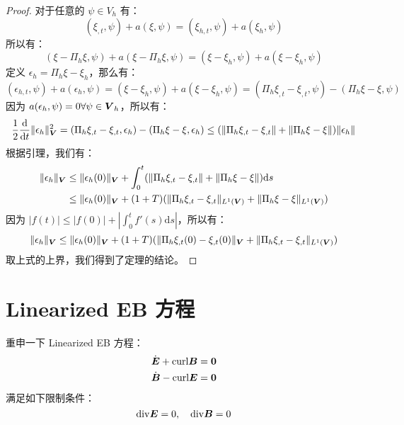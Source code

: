 \documentclass[lang=cn,a4paper,newtx]{elegantpaper}
\begin{document}
\begin{proof}
对于任意的 $\psi \in V_h$ 有：
$$
(\xi_{,t}, \psi) + a(\xi, \psi) =  (\xi_{h, t}, \psi) + a(\xi_h, \psi)
$$
所以有：
$$
(\xi - \Pi_h \xi, \psi) + a(\xi - \Pi_h \xi, \psi) = (\xi - \xi_h, \psi) + a(\xi
- \xi_h, \psi)
$$
定义 $\epsilon_h = \Pi_h \xi - \xi_h$，那么有：
$$
(\epsilon_{h, t}, \psi) + a(\epsilon_h, \psi) = (\xi - \xi_h, \psi) + a(\xi -
\xi_h, \psi)
= (\Pi_h \xi_{,t} - \xi_{,t}, \psi) - (\Pi_h \xi - \xi, \psi)
$$
因为 $a(\epsilon_h, \psi) = 0 \forall \psi \in \boldsymbol{V}_h$，所以有：
$$
\frac{1}{2} \frac{\mathrm{d}}{\mathrm{d}t}\|\epsilon_h\|^2_{\boldsymbol{V}} =
(\Pi_h \xi_{, t} - \xi_{, t}, \epsilon_h) - (\Pi_h \xi - \xi, \epsilon_h) \leq
(\|\Pi_h \xi_{, t} - \xi_{, t}\| + \|\Pi_h \xi - \xi\|)\|\epsilon_h\|
$$
根据引理，我们有：
$$
\begin{aligned}
\|\epsilon_h\|_{\boldsymbol{V}} & \leq \|\epsilon_h(0)\|_{\boldsymbol{V}} + \int_0^t
(\|\Pi_h \xi_{, t} - \xi_{, t}\| + \|\Pi_h \xi - \xi\|) \mathrm{d}s \\
& \leq \|\epsilon_h(0)\|_{\boldsymbol{V}} + (1+T)(\|\Pi_h \xi_{,t} - \xi_{, t}\|_{L^1(\boldsymbol{V})}
+ \|\Pi_h \xi - \xi\|_{L^1(\boldsymbol{V})})
\end{aligned}
$$
因为 $|f(t)| \leq |f(0)| + |\int_0^t f'(s) \mathrm{d}s|$，所以有：
$$
\|\epsilon_h\|_{\boldsymbol{V}} \leq \|\epsilon_h(0)\|_{\boldsymbol{V}} + (1+T)(\|\Pi_h \xi_{,
t}(0) - \xi_{, t}(0)\|_{\boldsymbol{V}} + \|\Pi_h \xi_{,t} - \xi_{,t}\|_{L^1(\boldsymbol{V})})
$$
取上式的上界，我们得到了定理的结论。
\end{proof}

\section{Linearized EB 方程}
重申一下 Linearized EB 方程：
\begin{equation}
\label{lineareb}
\begin{aligned}
\dot{\boldsymbol{E}} + \mathrm{curl} \boldsymbol{B} & = \boldsymbol{0}\\
\dot{\boldsymbol{B}} - \mathrm{curl} \boldsymbol{E} & = \boldsymbol{0}
\end{aligned}
\end{equation}
满足如下限制条件：
\begin{equation}
\label{linearebconstraint}
\mathrm{div} \boldsymbol{E} = 0, \quad \mathrm{div} \boldsymbol{B} = 0
\end{equation}
\end{document}

